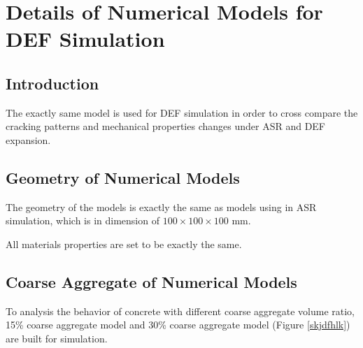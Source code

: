 \clearpage
\section{Details of Numerical Models for DEF Simulation}

\subsection{Introduction}

The exactly same model is used for DEF simulation in order to cross compare the cracking patterns and mechanical properties changes under ASR and DEF expansion.

\subsection{Geometry of Numerical Models}

The geometry of the models is exactly the same as models using in ASR simulation, which is in dimension of $100 \times 100 \times 100$ mm.

All materials properties are set to be exactly the same.

\subsection{Coarse Aggregate of Numerical Models}

To analysis the behavior of concrete with different coarse aggregate volume ratio, 15\% coarse aggregate model and 30\% coarse aggregate model (Figure \ref{skjdfhlk}) are built for simulation.

